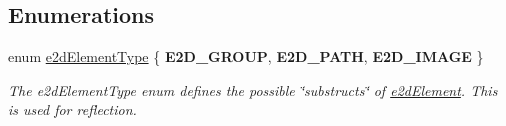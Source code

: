 \subsection*{Enumerations}
\begin{DoxyCompactItemize}
\item 
enum \hyperlink{group__e2d_element_ga9bc8cfdec08c7e9069fc707ee456fd38}{e2d\-Element\-Type} \{ {\bfseries E2\-D\-\_\-\-G\-R\-O\-U\-P}, 
{\bfseries E2\-D\-\_\-\-P\-A\-T\-H}, 
{\bfseries E2\-D\-\_\-\-I\-M\-A\-G\-E}
 \}
\begin{DoxyCompactList}\small\item\em The e2d\-Element\-Type enum defines the possible \char`\"{}substructs\char`\"{} of \hyperlink{structe2d_element}{e2d\-Element}. This is used for reflection. \end{DoxyCompactList}\end{DoxyCompactItemize}
